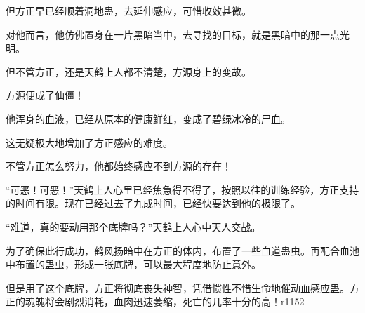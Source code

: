 \begin{this_body}
但方正早已经顺着洞地蛊，去延伸感应，可惜收效甚微。

对他而言，他仿佛置身在一片黑暗当中，去寻找的目标，就是黑暗中的那一点光明。

但不管方正，还是天鹤上人都不清楚，方源身上的变故。

方源便成了仙僵！

他浑身的血液，已经从原本的健康鲜红，变成了碧绿冰冷的尸血。

这无疑极大地增加了方正感应的难度。

不管方正怎么努力，他都始终感应不到方源的存在！

“可恶！可恶！”天鹤上人心里已经焦急得不得了，按照以往的训练经验，方正支持的时间有限。现在已经过去了九成时间，已经快要达到他的极限了。

“难道，真的要动用那个底牌吗？”天鹤上人心中天人交战。

为了确保此行成功，鹤风扬暗中在方正的体内，布置了一些血道蛊虫。再配合血池中布置的蛊虫，形成一张底牌，可以最大程度地防止意外。

但是用了这个底牌，方正将彻底丧失神智，凭借惯性不惜生命地催动血感应蛊。方正的魂魄将会剧烈消耗，血肉迅速萎缩，死亡的几率十分的高！r1152

\end{this_body}

